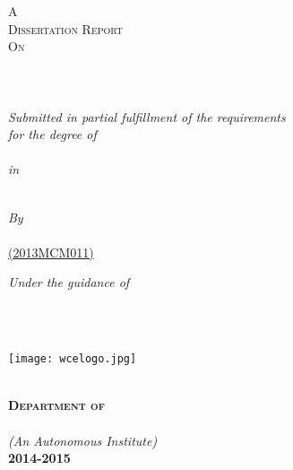 
\begin{titlepage}
\begin{center}
\textsc{\LARGE A\\Dissertation Report\\[0.2cm]On}\\[0.2cm] %

\HRule \\[0.1cm] %
\vspace{0.5cm}
{\huge \bfseries \ttitle}\\[0.3cm] %
\HRule \\[0.5cm] %

\large{\textit{Submitted in partial fulfillment of the requirements\\ for the degree of}}\\[0.4cm] \textbf{\Large{\textit{\degreename}}}\\

\large{\textit{in}}\\
\textbf{\Large{\textit{\deptname}}}\\[0.5cm]



 \begin{minipage}{0.4\textwidth}
\begin{center} \large
\emph{By}\\[0.3cm]
\href{http://ravindramn.blogspot.in}{\authornames\\ %
(2013MCM011)}
\end{center}
\end{minipage}

\vspace{0.5cm}

\begin{minipage}{0.4\textwidth}
\begin{center} \large
\emph{Under the guidance of} \\ 
{\supname\\ } %
\end{center}
\end{minipage}\\[1cm]

 \begin{minipage}{\textwidth}
\centering
	 \texttt{[image: wcelogo.jpg]}
\end{minipage}\\[1cm]


\textbf{\large{\textsc{Department of \deptname}}}\\ %
 
\textbf{\textsc{\large {\univname}}}\\ %
\textit{\large{(An Autonomous Institute)}}\\[0.3cm]

\textbf{\Large 2014-2015}\\[1cm] %
 
\vfill
\end{center}

\end{titlepage}
